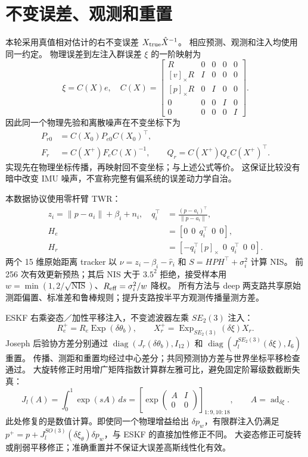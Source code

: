 \documentclass[11pt,a4paper]{ctexart}
\begin{document}
\section{不变误差、观测和重置}
本轮采用真值相对估计的右不变误差 $X_{\rm true}\hat X^{-1}$。
相应预测、观测和注入均使用同一约定。
物理误差到左注入群误差 $\xi$ 的一阶映射为
\begin{equation}
\xi=C(X)e,\quad C(X)=\begin{bmatrix}
R&0&0&0&0\\{}[v]_\times R&I&0&0&0\\{}[p]_\times R&0&I&0&0\\
0&0&0&I&0\\0&0&0&0&I
\end{bmatrix}.
\end{equation}
因此同一个物理先验和离散噪声在不变坐标下为
\begin{align}
P_{r0}&=C(X_0)P_{e0}C(X_0)^\top,\\
F_r&=C(X^+)F_eC(X)^{-1},\qquad Q_r=C(X^+)Q_eC(X^+)^\top.
\end{align}
实现先在物理坐标传播，再映射回不变坐标；与上述公式等价。
这保证比较没有暗中改变 IMU 噪声，不宣称完整有偏系统的误差动力学自治。

本数据协议使用零杆臂 TWR：
\begin{align}
z_i=\|p-a_i\|+\beta_i+n_i,\quad
q_i^\top&=\frac{(p-a_i)^\top}{\|p-a_i\|},\\
H_e&=[0\ \ 0\ \ q_i^\top\ \ 0\ \ 0],\\
H_r&=[-q_i^\top[p]_\times\ \ 0\ \ q_i^\top\ \ 0\ \ 0].
\end{align}
两个 15 维原始距离 tracker 以 $\nu=z_i-\beta_i-\hat r_i$ 和
$S=HPH^\top+\sigma_i^2$ 计算 NIS。
前 256 次有效更新预热；其后 NIS 大于 $3.5^2$ 拒绝，接受样本用
$w=\min(1,2/\sqrt{\mathrm{NIS}})$、$R_{\rm eff}=\sigma_i^2/w$ 降权。
所有方法与 deep 两支路共享原始测距偏置、标准差和鲁棒规则；提升支路按半平方观测传播量测方差。

ESKF 右乘姿态／加性平移注入，不变滤波器左乘 $SE_2(3)$ 注入：
\begin{equation}
R_{e}^+=R_e\operatorname{Exp}(\delta\theta_b),\qquad
X_r^+=\operatorname{Exp}_{SE_2(3)}(\delta\xi)X_r.
\end{equation}
Joseph 后验协方差分别通过
$\operatorname{diag}(J_r(\delta\theta_b),I_{12})$ 和
$\operatorname{diag}(J_l^{SE_2(3)}(\delta\xi),I_6)$ 重置。
传播、测距和重置均经过中心差分；共同预测协方差与世界坐标平移检查通过。
大旋转修正时用增广矩阵指数计算群左雅可比，避免固定阶幂级数截断失真：
\begin{equation}
J_l(A)=\int_0^1\exp(sA)\,ds
=\left[\exp\begin{pmatrix}A&I\\0&0\end{pmatrix}\right]_{1:9,10:18},
\qquad A=\operatorname{ad}_{\delta\xi}.
\end{equation}
此处修复的是数值计算。即使同一个物理增益给出 $\delta p_w$，有限群注入仍满足
$p^+=p+J_l^{SO(3)}(\delta\xi_\theta)\delta p_w$，与 ESKF 的直接加性修正不同。
大姿态修正可旋转或削弱平移修正；准确重置并不保证大误差高斯线性化有效。
\end{document}
